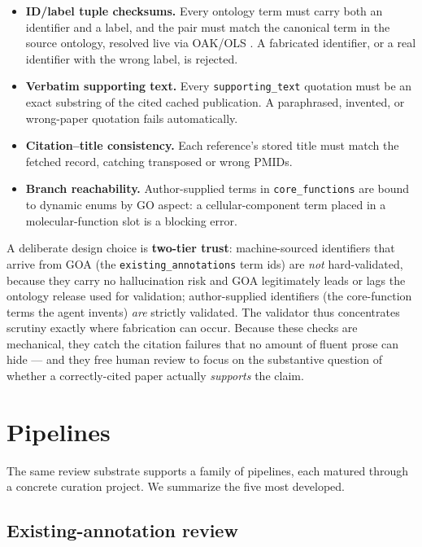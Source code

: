 \documentclass[11pt]{article}
\providecommand{\tightlist}{%
  \setlength{\itemsep}{0pt}\setlength{\parskip}{0pt}}
\newcommand{\code}[1]{\texttt{#1}}
\begin{document}
\begin{itemize}
\tightlist
\item \textbf{ID/label tuple checksums.} Every ontology term must carry both an
identifier and a label, and the pair must match the canonical term in the source
ontology, resolved live via OAK/OLS \cite{oak}. A fabricated identifier, or a real
identifier with the wrong label, is rejected.
\item \textbf{Verbatim supporting text.} Every \code{supporting\_text} quotation
must be an exact substring of the cited cached publication. A paraphrased,
invented, or wrong-paper quotation fails automatically.
\item \textbf{Citation--title consistency.} Each reference's stored title must
match the fetched record, catching transposed or wrong PMIDs.
\item \textbf{Branch reachability.} Author-supplied terms in \code{core\_functions}
are bound to dynamic enums by GO aspect: a cellular-component term placed in a
molecular-function slot is a blocking error.
\end{itemize}

A deliberate design choice is \textbf{two-tier trust}: machine-sourced identifiers
that arrive from GOA (the \code{existing\_annotations} term ids) are \emph{not}
hard-validated, because they carry no hallucination risk and GOA legitimately leads
or lags the ontology release used for validation; author-supplied identifiers (the
core-function terms the agent invents) \emph{are} strictly validated. The
validator thus concentrates scrutiny exactly where fabrication can occur. Because
these checks are mechanical, they catch the citation failures that no amount of
fluent prose can hide --- and they free human review to focus on the substantive
question of whether a correctly-cited paper actually \emph{supports} the claim.

\section{Pipelines}
\label{sec:pipelines}

The same review substrate supports a family of pipelines, each matured through a
concrete curation project. We summarize the five most developed.

\subsection{Existing-annotation review}
\end{document}
